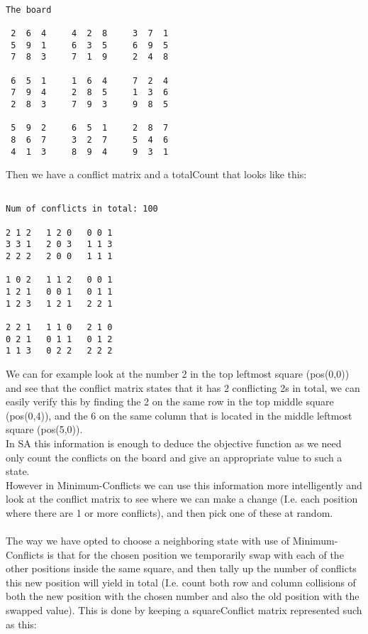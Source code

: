\documentclass[12pt, a4paper]{article}
\begin{document}
\begin{verbatim}

The board

 2  6  4     4  2  8     3  7  1 
 5  9  1     6  3  5     6  9  5 
 7  8  3     7  1  9     2  4  8 

 6  5  1     1  6  4     7  2  4 
 7  9  4     2  8  5     1  3  6 
 2  8  3     7  9  3     9  8  5 

 5  9  2     6  5  1     2  8  7 
 8  6  7     3  2  7     5  4  6 
 4  1  3     8  9  4     9  3  1 

\end{verbatim}

\noindent
Then we have a conflict matrix and a totalCount that looks like this:

\begin{verbatim}

Num of conflicts in total: 100

2 1 2 	1 2 0 	0 0 1 
3 3 1 	2 0 3 	1 1 3 
2 2 2 	2 0 0 	1 1 1 

1 0 2 	1 1 2 	0 0 1 
1 2 1 	0 0 1 	0 1 1 
1 2 3 	1 2 1 	2 2 1 

2 2 1 	1 1 0 	2 1 0 
0 2 1 	0 1 1 	0 1 2 
1 1 3 	0 2 2 	2 2 2 

\end{verbatim}
\noindent
We can for example look at the number 2 in the top leftmost square (pos(0,0)) and see that the conflict matrix states that it has 2 conflicting 2s in total, we can easily verify this by finding the 2 on the same row in the top middle square (pos(0,4)), and the 6 on the same column that is located in the middle leftmost
square (pos(5,0)).
\\
In SA this information is enough to deduce the objective function as we need only count the conflicts on the board and give an appropriate value to such a state. \\
However in Minimum-Conflicts we can use this information more intelligently and look at the conflict matrix to see where we can make a change (I.e. each position where there are 1 or more conflicts), and then pick one of these at random.
\\\\
The way we have opted to choose a neighboring state with use of Minimum-Conflicts is that for the chosen position we temporarily swap with each of the other positions inside the same square, and then tally up the number of conflicts this new position will yield in total (I.e. count both row and column collisions of both the new position with the chosen number and also the old position with the swapped value). This is done by keeping a squareConflict matrix represented such as this:
\end{document}
